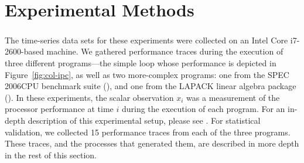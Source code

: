 \section{Experimental Methods}\label{sec:methods}



The time-series data sets for these experiments were collected on an
Intel Core\textsuperscript{\textregistered} i7-2600-based machine.
% 
% 
We gathered performance traces during the execution of three different
programs---the simple \col loop whose performance is depicted in
Figure~\ref{fig:col-ipc}, as well as two more-complex programs: one
from the SPEC 2006CPU benchmark suite (\gcc), and one from the LAPACK
linear algebra package (\svd).  In these experiments, the scalar
observation $x_i$ was a measurement of the processor performance at
time $i$ during the execution of each program.  
% 
% 
For an in-depth description of this experimental setup,
please see \cite{zach-IDA10,mytkowicz09,todd-phd}.  For statistical
validation, we collected 15 performance traces from each of the three
programs.  These traces, and the processes that generated them, are
described in more depth in the rest of this section.


